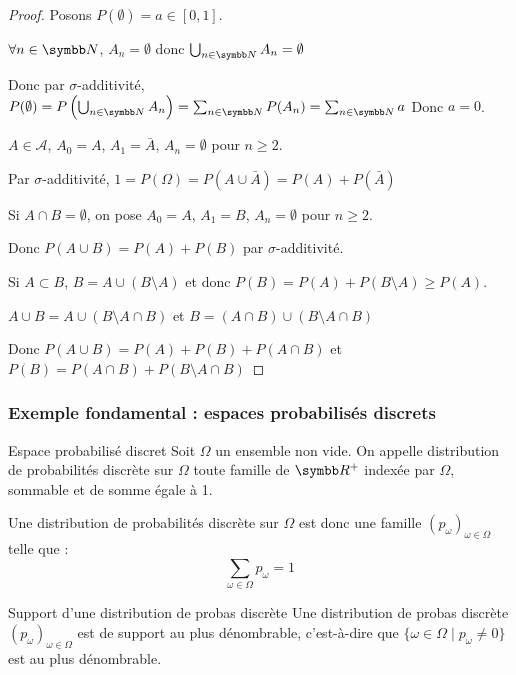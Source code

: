 \begin{proof}
    Posons $P(\emptyset) = a \in [0, 1]$.

    $\forall n \in \N$, $A_n = \emptyset$ donc $\bigcup_{n \in \N} A_n = \emptyset$

    Donc par $\sigma$-additivité, $P(\emptyset) = P\left( \bigcup_{n \in \N} A_n \right) = \sum_{n \in \N} P(A_n) = \sum_{n \in \N} a$
    Donc $a = 0$.

    $A \in \mathcal A$, $A_0 = A$, $A_1 = \bar A$, $A_n = \emptyset$ pour $n \geqslant 2$.

    Par $\sigma$-additivité, $1 = P(\Omega) = P(A \cup \bar A) = P(A) + P(\bar A) $

    Si $A \cap B = \emptyset$, on pose $A_0 = A$, $A_1 = B$, $A_n = \emptyset$ pour $n \geqslant 2$.

    Donc $P(A \cup B) = P(A) + P(B)$ par $\sigma$-additivité.

    Si $A \subset B$, $B = A \cup (B \setminus A)$ et donc $P(B) = P(A) + P(B \setminus A) \geqslant P(A)$.

    $A \cup B = A \cup (B \setminus A\cap B)$ et $B = (A \cap B) \cup (B \setminus A \cap B)$

    Donc $P(A \cup B) = P(A) + P(B) + P(A \cap B)$ et $P(B) = P(A \cap B) + P(B \setminus A \cap B)$
\end{proof}


\subsubsection{Exemple fondamental : espaces probabilisés discrets }

\begin{definition}{Espace probabilisé discret}{}
    Soit $\Omega$ un ensemble non vide. On appelle distribution de probabilités 
    discrète sur $\Omega$ toute famille de $\R^+$ indexée par $\Omega$, sommable 
    et de somme égale à 1.     

    Une distribution de probabilités discrète sur $\Omega$ est donc une famille 
    $(p_\omega)_{\omega \in \Omega}$ telle que : 
    $$ \sum_{\omega \in \Omega } p_\omega = 1$$
\end{definition}

\begin{proposition}{Support d'une distribution de probas discrète}{}
    Une distribution de probas discrète $(p_\omega)_{\omega \in \Omega}$
    est de support au plus dénombrable, c'est-à-dire que 
    $\{\omega \in \Omega \mid p_\omega \neq 0 \}$ est au plus dénombrable.
\end{proposition}


